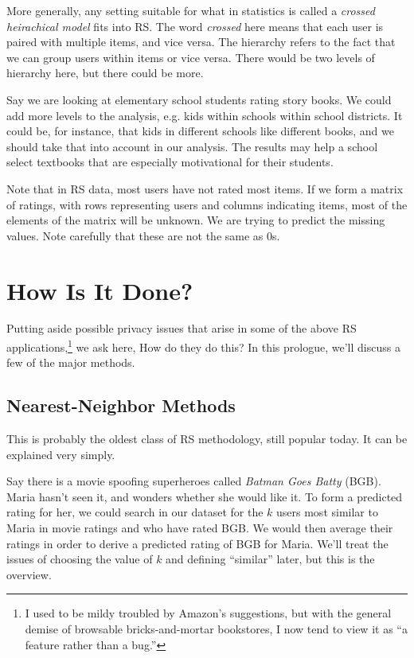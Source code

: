 More generally, any setting suitable for what in statistics is called
a \textit{crossed heirachical model} fits into RS.  The word
\textit{crossed} here means that each user is paired with multiple
items, and vice versa.  The hierarchy refers to the fact that we can
group users within items or vice versa.  There would be two levels of
hierarchy here, but there could be more.  

Say we are looking at elementary school students rating story books.  We
could add more levels to the analysis, e.g. kids within schools within
school districts.  It could be, for instance, that kids in different
schools like different books, and we should take that into account in
our analysis.  The results may help a school select textbooks that are
especially motivational for their students.

Note that in RS data, most users have not rated most items.  If we form
a matrix of ratings, with rows representing users and columns indicating
items, most of the elements of the matrix will be unknown.  We are
trying to predict the missing values.  Note carefully that these are not
the same as 0s.

\section{How Is It Done?}

Putting aside possible privacy issues that arise in some of the above RS
applications,\footnote{I used to be mildy
troubled by Amazon's suggestions, but with the general demise of
browsable bricks-and-mortar bookstores, I now tend to view it as ``a
feature rather than a bug.''} we ask here, How do they do this?  In this
prologue, we'll discuss a few of the major methods.

\subsection{Nearest-Neighbor Methods}

This is probably the oldest class of RS methodology, still popular
today.  It can be explained very simply.

Say there is a movie spoofing superheroes called \textit{Batman Goes
Batty} (BGB).  Maria hasn't seen it, and wonders whether she would like
it.  To form a predicted rating for her, we could search in our dataset
for the $k$ users most similar to Maria in movie ratings and who have
rated BGB.  We would then average their ratings in order to derive a
predicted rating of BGB for Maria.  We'll treat the issues of choosing
the value of $k$ and defining ``similar'' later, but this is the
overview.

